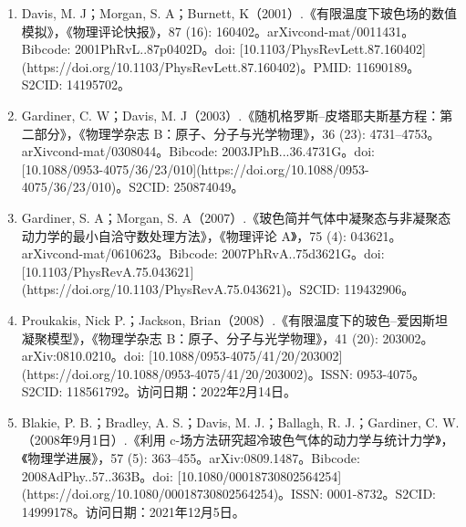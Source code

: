 \begin{enumerate}
\item Davis, M. J；Morgan, S. A；Burnett, K（2001）.《有限温度下玻色场的数值模拟》，《物理评论快报》，87 (16): 160402。arXiv\:cond-mat/0011431。Bibcode: 2001PhRvL..87p0402D。doi: [10.1103/PhysRevLett.87.160402](https://doi.org/10.1103/PhysRevLett.87.160402)。PMID: 11690189。S2CID: 14195702。
\item Gardiner, C. W；Davis, M. J（2003）.《随机格罗斯–皮塔耶夫斯基方程：第二部分》，《物理学杂志 B：原子、分子与光学物理》，36 (23): 4731–4753。arXiv\:cond-mat/0308044。Bibcode: 2003JPhB...36.4731G。doi: [10.1088/0953-4075/36/23/010](https://doi.org/10.1088/0953-4075/36/23/010)。S2CID: 250874049。
\item Gardiner, S. A；Morgan, S. A（2007）.《玻色简并气体中凝聚态与非凝聚态动力学的最小自洽守数处理方法》，《物理评论 A》，75 (4): 043621。arXiv\:cond-mat/0610623。Bibcode: 2007PhRvA..75d3621G。doi: [10.1103/PhysRevA.75.043621](https://doi.org/10.1103/PhysRevA.75.043621)。S2CID: 119432906。
\item Proukakis, Nick P.；Jackson, Brian（2008）.《有限温度下的玻色–爱因斯坦凝聚模型》，《物理学杂志 B：原子、分子与光学物理》，41 (20): 203002。arXiv:0810.0210。doi: [10.1088/0953-4075/41/20/203002](https://doi.org/10.1088/0953-4075/41/20/203002)。ISSN: 0953-4075。S2CID: 118561792。访问日期：2022年2月14日。
\item Blakie, P. B.；Bradley, A. S.；Davis, M. J.；Ballagh, R. J.；Gardiner, C. W.（2008年9月1日）.《利用 c-场方法研究超冷玻色气体的动力学与统计力学》，《物理学进展》，57 (5): 363–455。arXiv:0809.1487。Bibcode: 2008AdPhy..57..363B。doi: [10.1080/00018730802564254](https://doi.org/10.1080/00018730802564254)。ISSN: 0001-8732。S2CID: 14999178。访问日期：2021年12月5日。
\end{enumerate}